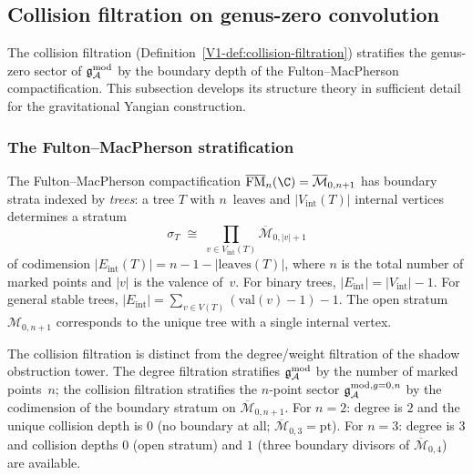 %
%

\subsection{Collision filtration on genus-zero convolution}
\label{subsec:thqg-V-collision-filtration}

The collision filtration
(Definition~\ref{V1-def:collision-filtration}) stratifies the
genus-zero sector of $\mathfrak{g}_{\mathcal{A}}^{\mathrm{mod}}$ by the boundary depth of the
Fulton--MacPherson compactification. This subsection develops its
structure theory in sufficient detail for the gravitational
Yangian construction.

\subsubsection{The Fulton--MacPherson stratification}

\begin{definition}
The Fulton--MacPherson compactification
$\FM_n(\C) = \overline{\mathcal{M}}_{0,n+1}$ has boundary strata
indexed by \emph{trees}: a tree $T$ with $n$~leaves and
$|V_{\mathrm{int}}(T)|$ internal vertices determines a stratum
\begin{equation}%
\sigma_T
\;\cong\;
\prod_{v \in V_{\mathrm{int}}(T)}
\overline{\mathcal{M}}_{0,|v|+1}
\end{equation}
of codimension $|E_{\mathrm{int}}(T)| = n - 1 - |\mathrm{leaves}(T)|$,
where $n$ is the total number of marked points and $|v|$ is the
valence of~$v$. For binary trees,
$|E_{\mathrm{int}}| = |V_{\mathrm{int}}| - 1$. For general stable
trees, $|E_{\mathrm{int}}| = \sum_{v \in V(T)}(\mathrm{val}(v) - 1) - 1$.
The open stratum
$\mathcal{M}_{0,n+1}$ corresponds to the unique tree with a single
internal vertex.
\end{definition}

\begin{remark}
The collision filtration is distinct from the degree/weight filtration
of the shadow obstruction tower. The degree filtration stratifies
$\mathfrak{g}_{\mathcal{A}}^{\mathrm{mod}}$ by the number of marked points~$n$; the collision
filtration stratifies the $n$-point sector
$\mathfrak{g}_{\mathcal{A}}^{\mathrm{mod},g{=}0,n}$ by the codimension
of the boundary stratum on $\overline{\mathcal{M}}_{0,n+1}$.
For $n = 2$: degree is $2$ and the unique collision depth is $0$
(no boundary at all; $\overline{\mathcal{M}}_{0,3} = \mathrm{pt}$).
For $n = 3$: degree is $3$ and collision depths $0$ (open stratum)
and $1$ (three boundary divisors of $\overline{\mathcal{M}}_{0,4}$)
are available.
\end{remark}

